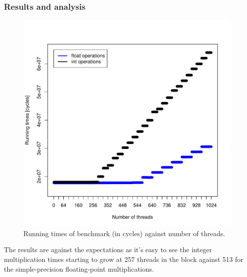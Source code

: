 \documentclass{article}
\def \scalingfactor{.8}
\begin{document}
	\subsubsection{Results and analysis}
    \begin{figure}[h]
    	\centering
		\vspace{-20pt}
	    \includegraphics[width=\scalingfactor\linewidth]{"graphics/float_vs_int_running_times"}
		\vspace{-15pt}
        \caption{Running times of benchmark (in cycles) against number of threads.}
    \end{figure}
	
    The results are against the expectations as it's easy to see the integer
    multiplication times starting to grow at 257 threads in the block against
    513 for the simple-precision floating-point multiplications.
    
\end{document}
